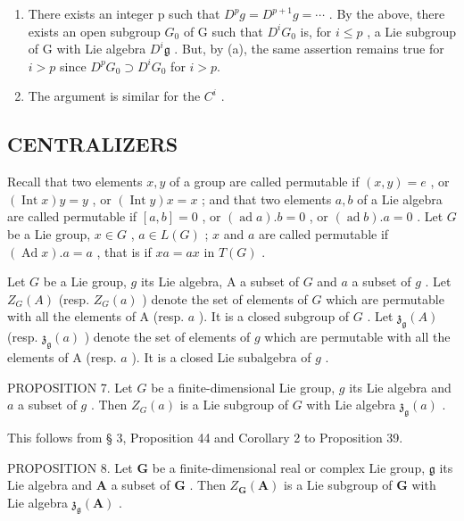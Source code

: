 \begin{enumerate}
\def\labelenumi{(\alph{enumi})}
\setcounter{enumi}{2}
\item
  There exists an integer p such that \(D^{p}g = D^{p+1}g = \cdots\) . By the above, there exists an open subgroup \(G_{0}\) of G such that \(D^{i}G_{0}\) is, for \(i \leqslant p\) , a Lie subgroup of G with Lie algebra \(D^{i}\mathfrak{g}\) . But, by (a), the same assertion remains true for \(i > p\) since \(D^{p}G_{0} \supset D^{i}G_{0}\) for \(i > p\).
\item
  The argument is similar for the \(C^{i}\) .
\end{enumerate}

\subsection{CENTRALIZERS}

Recall that two elements \(x, y\) of a group are called permutable if \((x, y) = e\) , or \((\operatorname{Int} x)y = y\) , or \((\operatorname{Int} y)x = x\) ; and that two elements \(a, b\) of a Lie algebra are called permutable if \([a, b] = 0\) , or \((\operatorname{ad} a).b = 0\) , or \((\operatorname{ad} b).a = 0\) . Let \(G\) be a Lie group, \(x \in G\) , \(a \in L(G)\) ; \(x\) and \(a\) are called permutable if \((\operatorname{Ad} x).a = a\) , that is if \(xa = ax\) in \(T(G)\) .

Let \(G\) be a Lie group, \(g\) its Lie algebra, A a subset of \(G\) and \(a\) a subset of \(g\) . Let \(Z_{G}(A)\) (resp. \(Z_{G}(a)\) ) denote the set of elements of \(G\) which are permutable with all the elements of A (resp. \(a\) ). It is a closed subgroup of \(G\) . Let \(\mathfrak{z}_{\mathfrak{g}}(A)\) (resp. \(\mathfrak{z}_{\mathfrak{g}}(a)\) ) denote the set of elements of \(g\) which are permutable with all the elements of A (resp. \(a\) ). It is a closed Lie subalgebra of \(g\) .

PROPOSITION 7. Let \(G\) be a finite-dimensional Lie group, \(g\) its Lie algebra and \(a\) a subset of \(g\) . Then \(Z_G(a)\) is a Lie subgroup of \(G\) with Lie algebra \(\mathfrak{z}_{\mathfrak{g}}(a)\) .

This follows from § 3, Proposition 44 and Corollary 2 to Proposition 39.

PROPOSITION 8. Let \(\mathbf{G}\) be a finite-dimensional real or complex Lie group, \(\mathfrak{g}\) its Lie algebra and \(\mathbf{A}\) a subset of \(\mathbf{G}\) . Then \(Z_{\mathbf{G}}(\mathbf{A})\) is a Lie subgroup of \(\mathbf{G}\) with Lie algebra \(\mathfrak{z}_{\mathfrak{g}}(\mathbf{A})\) .

